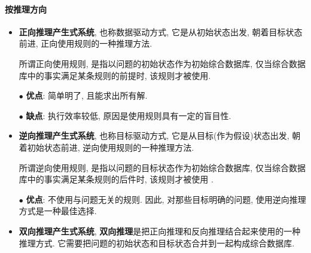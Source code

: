 \paragraph{按推理方向}
\begin{itemize}
\item \textbf{正向推理产生式系统}, 也称数据驱动方式, 它是从初始状态出发, 朝着目标状态前进, 正向使用规则的一种推理方法.
\begin{remark}
所谓正向使用规则, 是指以问题的初始状态作为初始综合数据库, 仅当综合数据库中的事实满足某条规则的前提时, 该规则才被使用.
\end{remark}

$\bullet$ \textbf{优点}: 简单明了, 且能求出所有解.

$\bullet$ \textbf{缺点}: 执行效率较低, 原因是使用规则具有一定的盲目性.

\item \textbf{逆向推理产生式系统}, 也称目标驱动方式, 它是从目标(作为假设)状态出发, 朝着初始状态前进, 逆向使用规则的一种推理方法.
\begin{remark}
    所谓逆向使用规则, 是指以问题的目标状态作为初始综合数据库, 仅当综合数据库中的事实满足某条规则的后件时, 该规则才被使用 .
\end{remark}

$\bullet$ \textbf{优点}: 不使用与问题无关的规则. 因此, 对那些目标明确的问题, 使用逆向推理方式是一种最佳选择.

\item \textbf{双向推理产生式系统}, \textbf{双向推理}是把正向推理和反向推理结合起来使用的一种推理方式. 它需要把问题的初始状态和目标状态合并到一起构成综合数据库.
\end{itemize}

